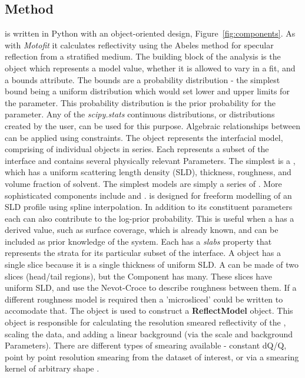 \documentclass[12pt]{article}
\begin{document}
\subsection*{Method}
 is written in Python with an object-oriented design, Figure~\ref{fig:components}. As with \emph{Motofit} \cite{Nelson2006} it calculates reflectivity using the Abeles method \cite{Heavens1955} for specular reflection from a stratified medium.
The building block of the analysis is the \Parameter object which represents a model value, whether it is allowed to vary in a fit, and a bounds attribute. The bounds are a probability distribution - the simplest bound being a uniform distribution which would set lower and upper limits for the parameter. This probability distribution is the prior probability for the parameter. Any of the \emph{scipy.stats} \cite{Jones2001-2017} continuous distributions, or distributions created by the user, can be used for this purpose. Algebraic relationships between \Parameter can be applied using constraints.
The \Structure object represents the interfacial model, comprising of individual \Component objects in series. Each \Component represents a subset of the interface and contains several physically relevant Parameters. The simplest \Component is a \Slab, which has a uniform scattering length density (SLD), thickness, roughness, and volume fraction of solvent. The simplest models are simply a series of \Slab. More sophisticated components include \LipidLeaflet and \Spline. \Spline is designed for freeform modelling of an SLD profile using spline interpolation. In addition to its constituent parameters each \Component can also contribute to the log-prior probability. This is useful when a \Component has a derived value, such as surface coverage, which is already known, and can be included as prior knowledge of the system. Each \Component has a \emph{slabs} property that represents the strata for its particular subset of the interface. A \Slab object has a single slice because it is a single thickness of uniform SLD. A \LipidLeaflet can be made of two slices (head/tail regions), but the \Spline Component has many. These slices have uniform SLD, and use the Nevot-Croce \cite{Nevot1980} to describe roughness between them. If a different roughness model is required then a 'microsliced' \Component could be written to accomodate that.
The \Structure object is used to construct a \textbf{ReflectModel} object. This object is responsible for calculating the resolution smeared reflectivity of the \Structure, scaling the data, and adding a linear background (via the scale and background Parameters). There are different types of smearing available - constant dQ/Q, point by point resolution smearing from the dataset of interest, or via a smearing kernel of arbitrary shape \cite{Nelson2014}.
\end{document}
